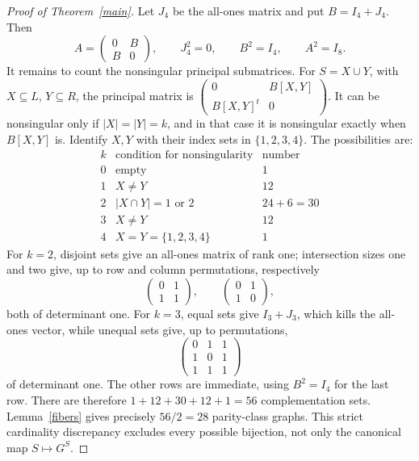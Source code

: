 \documentclass[11pt]{article}
\begin{document}
\begin{proof}[Proof of Theorem~\ref{main}]
Let \(J_4\) be the all-ones matrix and put \(B=I_4+J_4\).
Then
\[
 A=\begin{pmatrix}0&B\\B&0\end{pmatrix},\qquad
 J_4^2=0,\qquad B^2=I_4,\qquad A^2=I_8.
\]
It remains to count the nonsingular principal submatrices.
For \(S=X\cup Y\), with \(X\subseteq L\), \(Y\subseteq R\),
the principal matrix is
\(\left(\begin{smallmatrix}0&B[X,Y]\\B[X,Y]^t&0\end{smallmatrix}\right)\).
It can be nonsingular only if \(|X|=|Y|=k\), and in that case
it is nonsingular exactly when \(B[X,Y]\) is.
Identify \(X,Y\) with their index sets in \(\{1,2,3,4\}\).
The possibilities are:
\[
\begin{array}{c|c|c}
 k&\text{condition for nonsingularity}&\text{number}\\ \hline
 0&\text{empty}&1\\
 1&X\ne Y&12\\
 2&|X\cap Y|=1\text{ or }2&24+6=30\\
 3&X\ne Y&12\\
 4&X=Y=\{1,2,3,4\}&1
\end{array}
\]
For \(k=2\), disjoint sets give an all-ones matrix of rank one;
intersection sizes one and two give, up to row and column
permutations, respectively
\[
 \begin{pmatrix}0&1\\1&1\end{pmatrix},\qquad
 \begin{pmatrix}0&1\\1&0\end{pmatrix},
\]
both of determinant one.
For \(k=3\), equal sets give \(I_3+J_3\), which kills the all-ones
vector, while unequal sets give, up to permutations,
\[
 \begin{pmatrix}0&1&1\\1&0&1\\1&1&1\end{pmatrix}
\]
of determinant one. The other rows are immediate, using \(B^2=I_4\)
for the last row.
There are therefore \(1+12+30+12+1=56\) complementation sets.
Lemma~\ref{fibers} gives precisely \(56/2=28\) parity-class graphs.
This strict cardinality discrepancy excludes every possible bijection,
not only the canonical map \(S\mapsto G^S\).
\end{proof}
\end{document}
